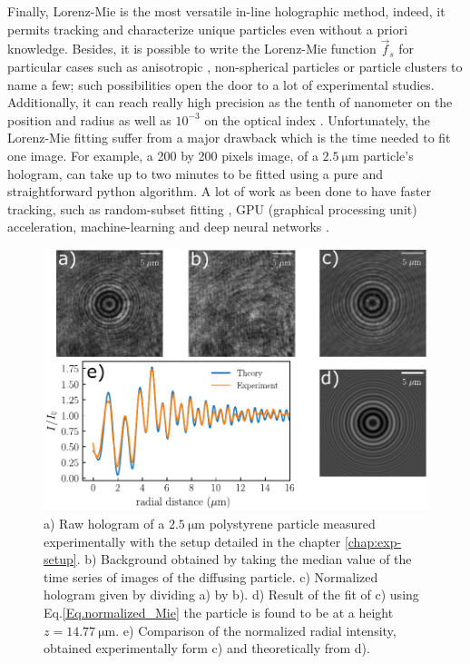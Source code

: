 Finally, Lorenz-Mie is the most versatile in-line holographic method, indeed, it permits tracking and characterize unique particles even without a priori knowledge. Besides, it is possible to write the Lorenz-Mie function $\vec{f}_s$ for particular cases such as anisotropic \cite{fung_holographic_2013}, non-spherical particles \cite{wang_using_2014} or particle clusters \cite{fung_holographic_2013, perry_real-space_2013} to name a few; such possibilities open the door to a lot of experimental studies. Additionally, it can reach really high precision as the tenth of nanometer on the position and radius as well as $10^{-3}$ on the optical index \cite{lee_characterizing_2007}. Unfortunately, the Lorenz-Mie fitting suffer from a major drawback which is the time needed to fit one image. For example, a 200 by 200 pixels image, of a $2.5 ~ \mathrm{\mu m}$ particle's hologram, can take up to two minutes to be fitted using a pure and straightforward python algorithm. A lot of work as been done to have faster tracking, such as random-subset fitting \cite{dimiduk_random-subset_2014}, GPU (graphical processing unit) acceleration, machine-learning \cite{yevick_machine-learning_2014, hannel_machine-learning_2018} and deep neural networks \cite{altman_catch_2020}.

\begin{figure}
	\centering
		\includegraphics[scale=1]{02_body/chapter2/images/lorenz_mie_fit_demo/plot_lorenz_mie.pdf}
		\caption{a) Raw hologram of a $2.5 ~ \mathrm{\mu m}$ polystyrene particle measured experimentally with the setup detailed in the chapter \ref{chap:exp-setup}. b) Background obtained by taking the median value of the time series of images of the diffusing particle. c) Normalized hologram given by dividing a) by b). d) Result of the fit of c) using Eq.{\ref{Eq.normalized_Mie}} the particle is found to be at a height $z = 14.77 ~ \mathrm{\mu m}$. e) Comparison of the normalized radial intensity, obtained experimentally form c) and theoretically from d).}
		\label{fig.Lorenz_mie_demo}
\end{figure}


